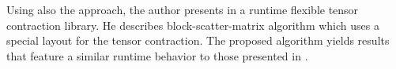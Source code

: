 Using also the  approach, the author presents in \cite{matthews:2018:high} a runtime flexible tensor contraction library.
He describes block-scatter-matrix algorithm which uses a special layout for the tensor contraction.
The proposed algorithm yields results that feature a similar runtime behavior to those presented in \cite{springer:2018:design}.
